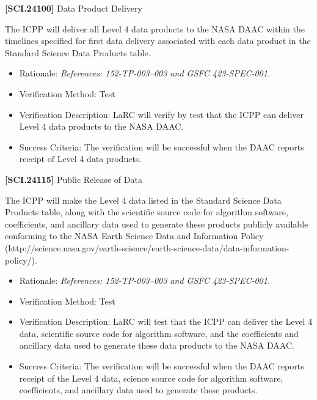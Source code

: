 \textbf{[SCI.24100]} Data Product Delivery

The \gls{ICPP} will deliver all Level 4 data products to the NASA \gls{DAAC} within the timelines specified for first data delivery associated with each data product in the Standard Science Data Products table.

\begin{itemize}
\item{} Rationale: \emph{References: 152-TP-003--003 and GSFC 423-SPEC-001.}

\item{} Verification Method: Test

\item{} Verification Description: \gls{LaRC} will verify by \gls{test} that the \gls{ICPP} can deliver Level 4 data products to the NASA \gls{DAAC}.

\item{} Success Criteria: The verification will be successful when the \gls{DAAC} reports receipt of Level 4 data products.

\end{itemize}

\textbf{[SCI.24115]} Public Release of Data

The \gls{ICPP} will make the Level 4 data listed in the Standard Science Data Products table, along with the scientific source code for algorithm software, coefficients, and ancillary data used to generate these products publicly available conforming to the NASA Earth Science Data and Information Policy (http:\slash \slash science.nasa.gov\slash earth-science\slash earth-science-data\slash data-information-policy\slash ).

\begin{itemize}
\item{} Rationale: \emph{References: 152-TP-003--003 and GSFC 423-SPEC-001.}

\item{} Verification Method: Test

\item{} Verification Description: \gls{LaRC} will \gls{test} that the \gls{ICPP} can deliver the Level 4 data, scientific source code for algorithm software, and the coefficients and ancillary data used to generate these data products to the NASA \gls{DAAC}.

\item{} Success Criteria: The verification will be successful when the \gls{DAAC} reports receipt of the Level 4 data, science source code for algorithm software, coefficients, and ancillary data used to generate these products.

\end{itemize}

